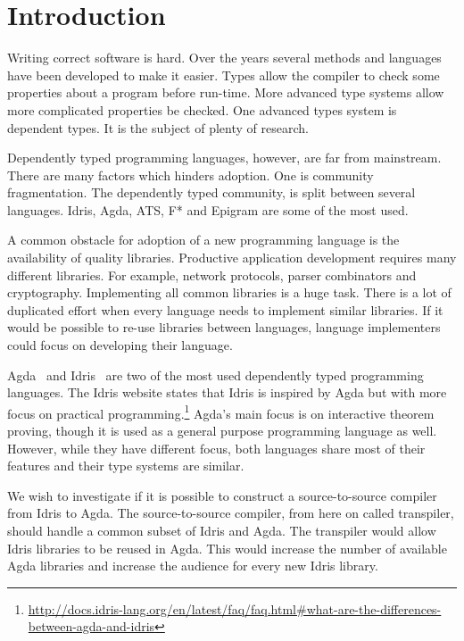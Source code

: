 \chapter{Introduction}

Writing correct software is hard. Over the years several methods and languages
have been developed to make it easier. Types allow the compiler to check some
properties about a program before run-time. More advanced type systems allow
more complicated properties be checked.
One advanced types system is dependent types. It is the subject of plenty
of research.

Dependently typed programming languages, however, are far from mainstream.
There are many factors which hinders adoption. One is community fragmentation.
The dependently typed community, is split between several languages.
Idris, Agda, ATS, F* and Epigram are some of the most used.

A common obstacle for adoption of a new programming language is the
availability of quality libraries. Productive application development requires
many different libraries.  For example, network protocols, parser combinators
and cryptography.  Implementing all common libraries is a huge task.  There is
a lot of duplicated effort when every language needs to implement similar
libraries.  If it would be possible to re-use libraries between languages,
language implementers could focus on developing their language.

Agda~\cite{agda} and Idris~\cite{idris} are two of the most used dependently
typed programming languages.
The Idris website states that Idris is inspired
by Agda but with more focus on practical
programming.\footnote{\url{http://docs.idris-lang.org/en/latest/faq/faq.html\#what-are-the-differences-between-agda-and-idris}}
Agda's main focus is on interactive theorem proving, though it is used as
a general purpose programming language as well.  However, while they have
different focus, both languages share most of their features and their type
systems are similar.

We wish to investigate if it is possible to construct a source-to-source
compiler from Idris to Agda. The source-to-source compiler, from here on called
transpiler, should handle a common subset of Idris and Agda.  The transpiler
would allow Idris libraries to be reused in Agda. This would increase the
number of available Agda libraries and increase the audience for every new
Idris library.

